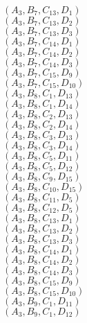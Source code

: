 \documentclass[14pt]{article}
\begin{document}
    $({A}_{3}, {B}_{7}, {C}_{13}, {D}_{1}) $ \\ 
    $({A}_{3}, {B}_{7}, {C}_{13}, {D}_{2}) $ \\ 
    $({A}_{3}, {B}_{7}, {C}_{13}, {D}_{3}) $ \\ 
    $({A}_{3}, {B}_{7}, {C}_{14}, {D}_{1}) $ \\ 
    $({A}_{3}, {B}_{7}, {C}_{14}, {D}_{2}) $ \\ 
    $({A}_{3}, {B}_{7}, {C}_{14}, {D}_{3}) $ \\ 
    $({A}_{3}, {B}_{7}, {C}_{15}, {D}_{9}) $ \\ 
    $({A}_{3}, {B}_{7}, {C}_{15}, {D}_{10}) $ \\ 
    $({A}_{3}, {B}_{8}, {C}_{1}, {D}_{13}) $ \\ 
    $({A}_{3}, {B}_{8}, {C}_{1}, {D}_{14}) $ \\ 
    $({A}_{3}, {B}_{8}, {C}_{2}, {D}_{13}) $ \\ 
    $({A}_{3}, {B}_{8}, {C}_{2}, {D}_{14}) $ \\ 
    $({A}_{3}, {B}_{8}, {C}_{3}, {D}_{13}) $ \\ 
    $({A}_{3}, {B}_{8}, {C}_{3}, {D}_{14}) $ \\ 
    $({A}_{3}, {B}_{8}, {C}_{5}, {D}_{11}) $ \\ 
    $({A}_{3}, {B}_{8}, {C}_{5}, {D}_{12}) $ \\ 
    $({A}_{3}, {B}_{8}, {C}_{9}, {D}_{15}) $ \\ 
    $({A}_{3}, {B}_{8}, {C}_{10}, {D}_{15}) $ \\ 
    $({A}_{3}, {B}_{8}, {C}_{11}, {D}_{5}) $ \\ 
    $({A}_{3}, {B}_{8}, {C}_{12}, {D}_{5}) $ \\ 
    $({A}_{3}, {B}_{8}, {C}_{13}, {D}_{1}) $ \\ 
    $({A}_{3}, {B}_{8}, {C}_{13}, {D}_{2}) $ \\ 
    $({A}_{3}, {B}_{8}, {C}_{13}, {D}_{3}) $ \\ 
    $({A}_{3}, {B}_{8}, {C}_{14}, {D}_{1}) $ \\ 
    $({A}_{3}, {B}_{8}, {C}_{14}, {D}_{2}) $ \\ 
    $({A}_{3}, {B}_{8}, {C}_{14}, {D}_{3}) $ \\ 
    $({A}_{3}, {B}_{8}, {C}_{15}, {D}_{9}) $ \\ 
    $({A}_{3}, {B}_{8}, {C}_{15}, {D}_{10}) $ \\ 
    $({A}_{3}, {B}_{9}, {C}_{1}, {D}_{11}) $ \\ 
    $({A}_{3}, {B}_{9}, {C}_{1}, {D}_{12}) $ \\ 
\end{document}
